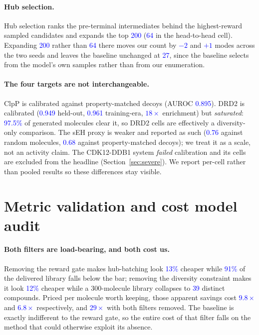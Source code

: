 \documentclass{article}
\newcommand{\checkval}[1]{\textcolor{blue}{#1}}
\begin{document}
\paragraph{Hub selection.}
Hub selection ranks the pre-terminal intermediates behind the highest-reward sampled candidates and expands the top \checkval{200} (\checkval{64} in the head-to-head cell). Expanding \checkval{200} rather than \checkval{64} there moves our count by \checkval{$-2$} and \checkval{$+1$} modes across the two seeds and leaves the baseline unchanged at \checkval{27}, since the baseline selects from the model's own samples rather than from our enumeration.

\paragraph{The four targets are not interchangeable.} ClpP is calibrated against property-matched decoys (AUROC \checkval{0.895}). DRD2 is calibrated (\checkval{0.949} held-out, \checkval{0.961} training-era, \checkval{$18\times$} enrichment) but \emph{saturated}: \checkval{97.5\%} of generated molecules clear it, so DRD2 cells are effectively a diversity-only comparison. The sEH proxy is weaker and reported as such (\checkval{0.76} against random molecules, \checkval{0.68} against property-matched decoys); we treat it as a scale, not an activity claim. The CDK12-DDB1 system \emph{failed} calibration and its cells are excluded from the headline (Section~\ref{sec:severe}). We report per-cell rather than pooled results so these differences stay visible.



\section{Metric validation and cost model audit}
\label{app:fair}
\paragraph{Both filters are load-bearing, and both cost us.}
Removing the reward gate makes hub-batching look \checkval{13\%} cheaper while \checkval{91\%} of the delivered library falls below the bar; removing the diversity constraint makes it look \checkval{12\%} cheaper while a 300-molecule library collapses to \checkval{39} distinct compounds. Priced per molecule worth keeping, those apparent savings cost \checkval{$9.8\times$} and \checkval{$6.8\times$} respectively, and \checkval{$29\times$} with both filters removed. The baseline is exactly indifferent to the reward gate, so the entire cost of that filter falls on the method that could otherwise exploit its absence.
\end{document}
